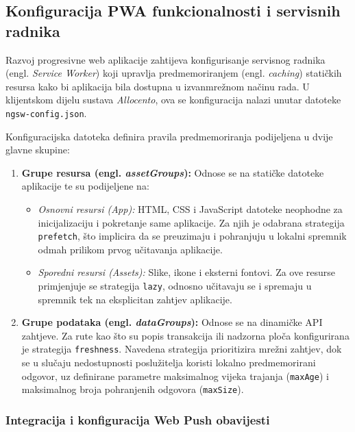 \documentclass[a4paper,12pt,oneside]{article}
\begin{document}
	\newpage
		
	\subsection{Konfiguracija PWA funkcionalnosti i servisnih radnika}
	Razvoj progresivne web aplikacije zahtijeva konfigurisanje servisnog radnika (engl. \textit{Service Worker}) koji upravlja predmemoriranjem (engl. \textit{caching}) statičkih resursa kako bi aplikacija bila dostupna u izvanmrežnom načinu rada. U klijentskom dijelu sustava \textit{Allocento}, ova se konfiguracija nalazi unutar datoteke \texttt{ngsw-config.json}.
	
	Konfiguracijska datoteka definira pravila predmemoriranja podijeljena u dvije glavne skupine:
	\begin{enumerate}
		\item \textbf{Grupe resursa (engl. \textit{assetGroups}):} Odnose se na statičke datoteke aplikacije te su podijeljene na:
		\begin{itemize}
			\item \textit{Osnovni resursi (App):} HTML, CSS i JavaScript datoteke neophodne za inicijalizaciju i pokretanje same aplikacije. Za njih je odabrana strategija \texttt{prefetch}, što implicira da se preuzimaju i pohranjuju u lokalni spremnik odmah prilikom prvog učitavanja aplikacije.
			
			\item \textit{Sporedni resursi (Assets):} Slike, ikone i eksterni fontovi. Za ove resurse primjenjuje se strategija \texttt{lazy}, odnosno učitavaju se i spremaju u spremnik tek na eksplicitan zahtjev aplikacije.
		\end{itemize}
		
		\item \textbf{Grupe podataka (engl. \textit{dataGroups}):} Odnose se na dinamičke API zahtjeve. Za rute kao što su popis transakcija ili nadzorna ploča konfigurirana je strategija \texttt{freshness}. Navedena strategija prioritizira mrežni zahtjev, dok se u slučaju nedostupnosti poslužitelja koristi lokalno predmemorirani odgovor, uz definirane parametre maksimalnog vijeka trajanja (\texttt{maxAge}) i maksimalnog broja pohranjenih odgovora (\texttt{maxSize}).
	\end{enumerate}

	\subsubsection{Integracija i konfiguracija Web Push obavijesti}
	
\end{document}
